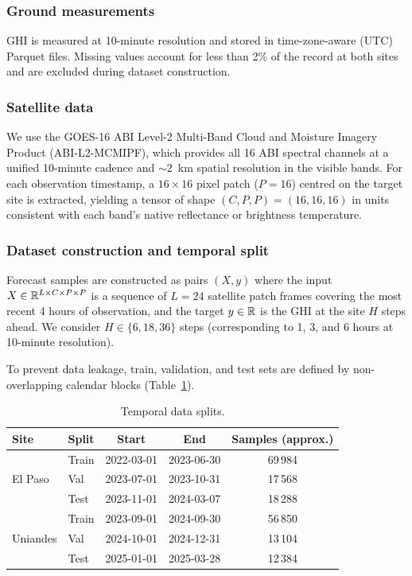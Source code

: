 \subsubsection{Ground measurements}

GHI is measured at 10-minute resolution and stored in time-zone-aware (UTC) Parquet
files. Missing values account for less than 2\% of the record at both sites and are
excluded during dataset construction.

\subsubsection{Satellite data}

We use the GOES-16 ABI Level-2 Multi-Band Cloud and Moisture Imagery Product
(ABI-L2-MCMIPF), which provides all 16 ABI spectral channels at a unified
10-minute cadence and ${\sim}2$~km spatial resolution in the visible bands.
For each observation timestamp, a $16 \times 16$ pixel patch ($P = 16$) centred
on the target site is extracted, yielding a tensor of shape $(C, P, P) = (16, 16, 16)$
in units consistent with each band's native reflectance or brightness temperature.

\subsubsection{Dataset construction and temporal split}

Forecast samples are constructed as pairs $(X, y)$ where the input
$X \in \mathbb{R}^{L \times C \times P \times P}$ is a sequence of $L = 24$ satellite
patch frames covering the most recent 4 hours of observation, and the target
$y \in \mathbb{R}$ is the GHI at the site $H$ steps ahead. We consider
$H \in \{6, 18, 36\}$ steps (corresponding to 1, 3, and 6 hours at 10-minute
resolution).

To prevent data leakage, train, validation, and test sets are defined by
non-overlapping calendar blocks (Table~\ref{tab:splits}).

\begin{table}[t]
  \centering
  \caption{Temporal data splits.}
  \label{tab:splits}
  \setlength{\tabcolsep}{4pt}
  \begin{tabular}{llccc}
    \toprule
    \textbf{Site} & \textbf{Split} & \textbf{Start} & \textbf{End} & \textbf{Samples (approx.)} \\
    \midrule
    \multirow{3}{*}{El Paso}
      & Train & 2022-03-01 & 2023-06-30 & 69\,984 \\
      & Val   & 2023-07-01 & 2023-10-31 & 17\,568 \\
      & Test  & 2023-11-01 & 2024-03-07 & 18\,288 \\
    \midrule
    \multirow{3}{*}{Uniandes}
      & Train & 2023-09-01 & 2024-09-30 & 56\,850 \\
      & Val   & 2024-10-01 & 2024-12-31 & 13\,104 \\
      & Test  & 2025-01-01 & 2025-03-28 & 12\,384 \\
    \bottomrule
  \end{tabular}
\end{table}

